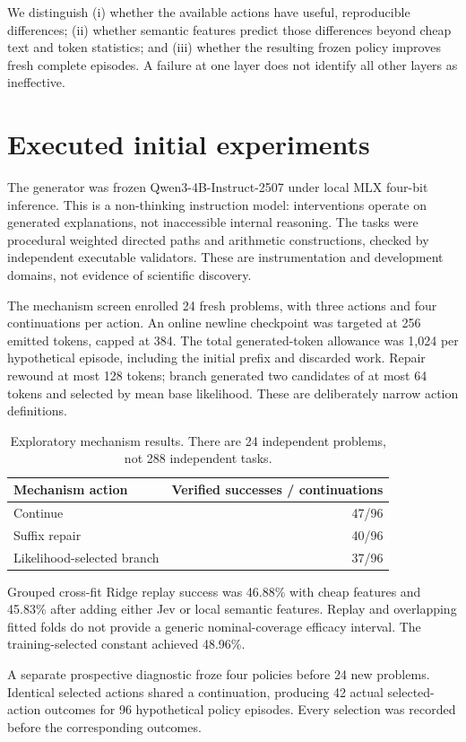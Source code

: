 \documentclass[11pt]{article}
\begin{document}
We distinguish (i) whether the available actions have useful, reproducible differences; (ii) whether semantic features predict those differences beyond cheap text and token statistics; and (iii) whether the resulting frozen policy improves fresh complete episodes. A failure at one layer does not identify all other layers as ineffective.

\section{Executed initial experiments}
The generator was frozen Qwen3-4B-Instruct-2507 under local MLX four-bit inference. This is a non-thinking instruction model: interventions operate on generated explanations, not inaccessible internal reasoning. The tasks were procedural weighted directed paths and arithmetic constructions, checked by independent executable validators. These are instrumentation and development domains, not evidence of scientific discovery.

The mechanism screen enrolled 24 fresh problems, with three actions and four continuations per action. An online newline checkpoint was targeted at 256 emitted tokens, capped at 384. The total generated-token allowance was 1,024 per hypothetical episode, including the initial prefix and discarded work. Repair rewound at most 128 tokens; branch generated two candidates of at most 64 tokens and selected by mean base likelihood. These are deliberately narrow action definitions.

\begin{table}[h]
\centering
\begin{tabular}{lr}
\toprule
Mechanism action & Verified successes / continuations\\
\midrule
Continue & 47/96\\
Suffix repair & 40/96\\
Likelihood-selected branch & 37/96\\
\bottomrule
\end{tabular}
\caption{Exploratory mechanism results. There are 24 independent problems, not 288 independent tasks.}
\end{table}

Grouped cross-fit Ridge replay success was 46.88\% with cheap features and 45.83\% after adding either Jev or local semantic features. Replay and overlapping fitted folds do not provide a generic nominal-coverage efficacy interval. The training-selected constant achieved 48.96\%.

A separate prospective diagnostic froze four policies before 24 new problems. Identical selected actions shared a continuation, producing 42 actual selected-action outcomes for 96 hypothetical policy episodes. Every selection was recorded before the corresponding outcomes.
\end{document}
